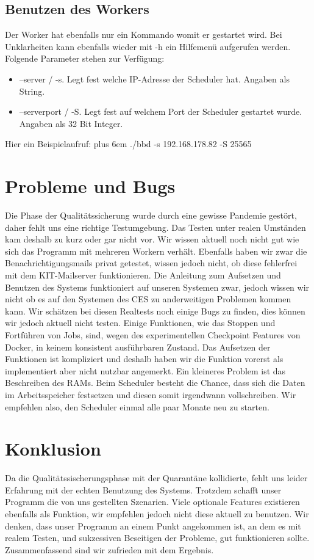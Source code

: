 \documentclass[a4paper,12pt]{article}
\makeatletter
\newenvironment{mycode}
 {\def\@xobeysp{\ }\verbatim\rightskip=0pt plus 6em\relax}
 {\endverbatim}
\makeatother
\begin{document}
\subsection{Benutzen des Workers}
Der Worker hat ebenfalls nur ein Kommando womit er gestartet wird. Bei Unklarheiten kann ebenfalls wieder mit -h ein Hilfemenü aufgerufen werden. Folgende Parameter stehen zur Verfügung:
\begin{itemize}
	\item --server / -s. Legt fest welche IP-Adresse der Scheduler hat. Angaben als String.
	\item --serverport / -S. Legt fest auf welchem Port der Scheduler gestartet wurde. Angaben als 32 Bit Integer.
\end{itemize}
Hier ein Beispielaufruf:
\begin{mycode}
	./bbd -s 192.168.178.82 -S 25565
\end{mycode}
\section{Probleme und Bugs}
Die Phase der Qualitätssicherung wurde durch eine gewisse Pandemie gestört, daher fehlt uns eine richtige Testumgebung. Das Testen unter realen Umständen kam deshalb zu kurz oder gar nicht vor. Wir wissen aktuell noch nicht gut wie sich das Programm mit mehreren Workern verhält. Ebenfalls haben wir zwar die Benachrichtigungsmails privat getestet, wissen jedoch nicht, ob diese fehlerfrei mit dem KIT-Mailserver funktionieren. Die Anleitung zum Aufsetzen und Benutzen des Systems funktioniert auf unseren Systemen zwar, jedoch wissen wir nicht ob es auf den Systemen des CES zu anderweitigen Problemen kommen kann.
Wir schätzen bei diesen Realtests noch einige Bugs zu finden, dies können wir jedoch aktuell nicht testen. 
\newline
Einige Funktionen, wie das Stoppen und Fortführen von Jobs, sind, wegen des experimentellen Checkpoint Features von Docker, in keinem konsistent ausführbaren Zustand. Das Aufsetzen der Funktionen ist kompliziert und deshalb haben wir die Funktion vorerst als implementiert aber nicht nutzbar angemerkt.
\newline
Ein kleineres Problem ist das Beschreiben des RAMs. Beim Scheduler besteht die Chance, dass sich die Daten im Arbeitsspeicher festsetzen und diesen somit irgendwann vollschreiben. Wir empfehlen also, den Scheduler einmal alle paar Monate neu zu starten. \newline
\section{Konklusion}
Da die Qualitätssischerungsphase mit der Quarantäne kollidierte, fehlt uns leider Erfahrung mit der echten Benutzung des Systems. Trotzdem schafft unser Programm die von uns gestellten Szenarien. Viele optionale Features existieren ebenfalls als Funktion, wir empfehlen jedoch nicht diese aktuell zu benutzen. Wir denken, dass unser Programm an einem Punkt angekommen ist, an dem es mit realem Testen, und sukzessiven Beseitigen der Probleme, gut funktionieren sollte.
Zusammenfassend sind wir zufrieden mit dem Ergebnis.

\clearpage
\end{document}
